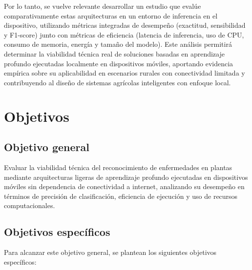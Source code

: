 Por lo tanto, se vuelve relevante desarrollar un estudio que evalúe comparativamente estas arquitecturas en un entorno de inferencia en el dispositivo, utilizando métricas 
integradas de desempeño (exactitud, sensibilidad y F1-score) junto con métricas de eficiencia (latencia de inferencia, uso de CPU, consumo de memoria, 
energía y tamaño del modelo). Este análisis permitirá determinar la viabilidad técnica real de soluciones basadas en aprendizaje profundo ejecutadas 
localmente en dispositivos móviles, aportando evidencia empírica sobre su aplicabilidad en escenarios rurales con conectividad limitada y 
contribuyendo al diseño de sistemas agrícolas inteligentes con enfoque local.

\section{Objetivos}

\subsection{Objetivo general}

Evaluar la viabilidad técnica del reconocimiento de enfermedades en plantas mediante arquitecturas ligeras de aprendizaje profundo
ejecutadas en dispositivos móviles sin dependencia de conectividad a internet, analizando su desempeño en términos de precisión de
clasificación, eficiencia de ejecución y uso de recursos computacionales.

\subsection{Objetivos específicos}

Para alcanzar este objetivo general, se plantean los siguientes objetivos específicos:


